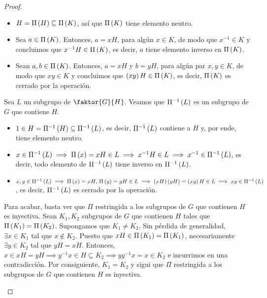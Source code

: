 \begin{proof}
\begin{enumerate}[i)]
            \begin{itemize}
                \item $H=\Pi\left( H\right) \subseteq\Pi\left( K\right)$, así que $\Pi\left( K\right)$ tiene elemento neutro.
                \item Sea $a\in\Pi\left( K\right)$. Entonces, $a=xH$, para algún $x\in K$, de modo que $x^{-1}\in K$ y concluimos que $x^{-1}H\in\Pi\left( K\right)$, es decir, $a$ tiene elemento inverso en $\Pi\left( K\right)$.
                \item Sean $a,b\in\Pi\left( K\right)$. Entonces, $a=xH$ y $b=yH$, para algún par $x,y\in K$, de modo que $xy\in K$ y concluimos que $\left( xy\right) H\in\Pi\left( K\right)$, es decir, $\Pi\left( K\right)$ es cerrado por la operación.
            \end{itemize}
            Sea $L$ un subgrupo de $\faktor{G}{H}$. Veamos que $\Pi^{-1}\left( L\right)$ es un subgrupo de $G$ que contiene $H$.
            \begin{itemize}
                \item $1\in H = \Pi^{-1}\left( H\right) \subseteq \Pi^{-1}\left( L\right)$, es decir, $\Pi^{-1}\left( L\right)$ contiene a $H$ y, por ende, tiene elemento neutro. 
                \item $x\in\Pi^{-1}\left( L\right) \implies \Pi\left( x\right)=xH\in L\implies x^{-1}H\in L\implies x^{-1}\in\Pi^{-1}\left( L\right)$, es decir, todo elemento de $\Pi^{-1}\left( L\right)$ tiene inverso en $\Pi^{-1}\left( L\right)$.
                \item $x,y\in\Pi^{-1}\left( L\right) \implies \Pi\left( x\right) = xH,\, \Pi\left( y\right)=yH\in L\implies \left( xH\right) \left( yH\right) = \left( xy\right) H\in L \implies xy\in \Pi^{-1}\left( L\right)$, es decir, $\Pi^{-1}\left( L\right)$ es cerrado por la operación.
            \end{itemize}
            Para acabar, basta ver que $\Pi$ restringida a los subgrupos de $G$ que contienen $H$ es inyectiva. Sean $K_1, K_2$ subgrupos de $G$ que contienen $H$ tales que $\Pi\left( K_1\right) = \Pi\left( K_2\right)$. Supongamos que $K_1\neq K_2$. Sin pérdida de generalidad, $\exists x\in K_1$ tal que $x\notin K_2$. Puesto que $xH\in\Pi\left( K_1\right)=\Pi\left( K_1\right)$, necesariamente $\exists y\in K_2$ tal que $yH=xH$. Entonces, $x\in xH=yH\implies y^{-1}x\in H\subseteq K_2\implies yy^{-1}x=x\in K_2$ e incurrimos en una contradicción. Por consiguiente, $K_1 = K_2$ y sigui que $\Pi$ restringida a los subgrupos de $G$ que contienen $H$ es inyectiva.
            

\end{enumerate}
\end{proof}

